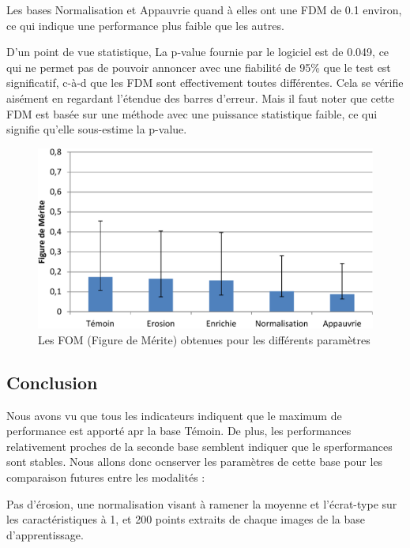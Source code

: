 Les bases Normalisation et Appauvrie quand à elles ont une FDM de 0.1 environ, ce qui indique une performance plus faible que les autres.

D'un point de vue statistique, La p-value fournie par le logiciel est de 0.049, ce qui ne permet pas de pouvoir annoncer avec une fiabilité de 95\% que le test est significatif, c-à-d que les FDM sont effectivement toutes différentes. Cela se vérifie aisément en regardant l'étendue des barres d'erreur. Mais il faut noter que cette FDM est basée sur une méthode avec une puissance statistique faible, ce qui signifie qu'elle sous-estime la p-value.

\begin{figure}[h!]
 \begin{center}
   \includegraphics[width=15cm]{images/FOM_param}
 \end{center}
 \caption{ \label{lab:fom_param} Les FOM (Figure de Mérite) obtenues pour les différents paramètres}
\end{figure}

\subsection{Conclusion}

Nous avons vu que tous les indicateurs indiquent que le maximum de performance est apporté apr la base Témoin. De plus, les  performances relativement proches de la seconde base semblent indiquer que le sperformances sont stables. Nous allons donc ocnserver les paramètres de cette base pour les comparaison futures entre les modalités :

Pas d'érosion, une normalisation visant à ramener la moyenne et l'écrat-type sur les caractéristiques à 1, et 200 points extraits de chaque images de la base d'apprentissage.
 

\FloatBarrier

